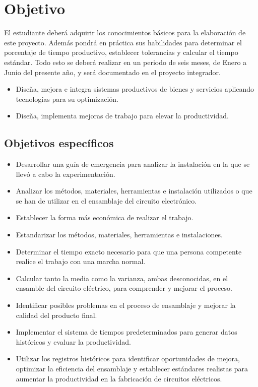     \section{Objetivo}
    El estudiante deberá adquirir los conocimientos básicos para la elaboración de este proyecto. Además pondrá en práctica sus habilidades para determinar el porcentaje de tiempo productivo, establecer tolerancias y calcular el tiempo estándar. Todo esto se deberá realizar en un periodo de seis meses, de Enero a Junio del presente año, y será documentado en el proyecto integrador.
    \begin{itemize}
        \item Diseña, mejora e integra sistemas productivos de bienes y servicios aplicando tecnologías para su optimización.
        \item Diseña, implementa mejoras de trabajo para elevar la productividad.
    \end{itemize}
    
    \subsection{Objetivos específicos }
    \begin{itemize}
        \item Desarrollar una guía de emergencia para analizar la instalación en la que se llevó a cabo la experimentación.
        \item Analizar los métodos, materiales, herramientas e instalación utilizados o que se han de utilizar en el ensamblaje del circuito electrónico.
        \item Establecer la forma más económica de realizar el trabajo.
        \item Estandarizar los métodos, materiales, herramientas e instalaciones.
        \item Determinar el tiempo exacto necesario para que una persona competente realice el trabajo con una marcha normal.
        \item Calcular tanto la media como la varianza, ambas desconocidas, en el ensamble del circuito eléctrico, para comprender y mejorar el proceso.
        \item Identificar posibles problemas en el proceso de ensamblaje y mejorar la calidad del producto final.
        \item Implementar el sistema de tiempos predeterminados para generar datos históricos y evaluar la productividad.
        \item Utilizar los registros históricos para identificar oportunidades de mejora, optimizar la eficiencia del ensamblaje y establecer estándares realistas para aumentar la productividad en la fabricación de circuitos eléctricos.
        \end{itemize}
